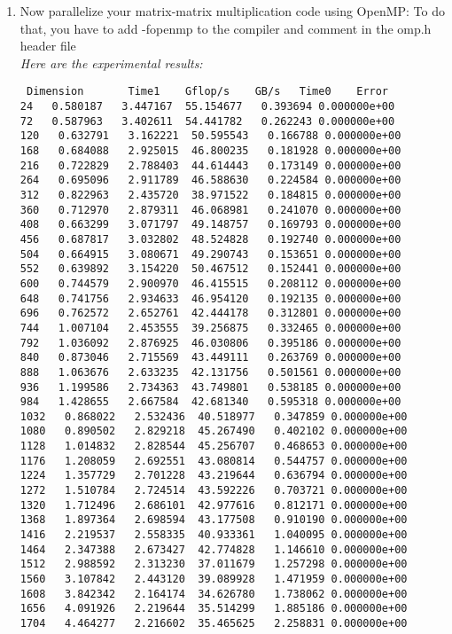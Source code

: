 \documentclass{article}
\begin{document}
\begin{enumerate}
\begin{enumerate}
\item  Now parallelize your matrix-matrix multiplication code using OpenMP: To do that, you have to add -fopenmp to the compiler and comment in the omp.h header file
\\\textit{Here are the experimental results:}
\begin{verbatim}
 Dimension       Time1    Gflop/s    GB/s   Time0    Error
24   0.580187   3.447167  55.154677   0.393694 0.000000e+00
72   0.587963   3.402611  54.441782   0.262243 0.000000e+00
120   0.632791   3.162221  50.595543   0.166788 0.000000e+00
168   0.684088   2.925015  46.800235   0.181928 0.000000e+00
216   0.722829   2.788403  44.614443   0.173149 0.000000e+00
264   0.695096   2.911789  46.588630   0.224584 0.000000e+00
312   0.822963   2.435720  38.971522   0.184815 0.000000e+00
360   0.712970   2.879311  46.068981   0.241070 0.000000e+00
408   0.663299   3.071797  49.148757   0.169793 0.000000e+00
456   0.687817   3.032802  48.524828   0.192740 0.000000e+00
504   0.664915   3.080671  49.290743   0.153651 0.000000e+00
552   0.639892   3.154220  50.467512   0.152441 0.000000e+00
600   0.744579   2.900970  46.415515   0.208112 0.000000e+00
648   0.741756   2.934633  46.954120   0.192135 0.000000e+00
696   0.762572   2.652761  42.444178   0.312801 0.000000e+00
744   1.007104   2.453555  39.256875   0.332465 0.000000e+00
792   1.036092   2.876925  46.030806   0.395186 0.000000e+00
840   0.873046   2.715569  43.449111   0.263769 0.000000e+00
888   1.063676   2.633235  42.131756   0.501561 0.000000e+00
936   1.199586   2.734363  43.749801   0.538185 0.000000e+00
984   1.428655   2.667584  42.681340   0.595318 0.000000e+00
1032   0.868022   2.532436  40.518977   0.347859 0.000000e+00
1080   0.890502   2.829218  45.267490   0.402102 0.000000e+00
1128   1.014832   2.828544  45.256707   0.468653 0.000000e+00
1176   1.208059   2.692551  43.080814   0.544757 0.000000e+00
1224   1.357729   2.701228  43.219644   0.636794 0.000000e+00
1272   1.510784   2.724514  43.592226   0.703721 0.000000e+00
1320   1.712496   2.686101  42.977616   0.812171 0.000000e+00
1368   1.897364   2.698594  43.177508   0.910190 0.000000e+00
1416   2.219537   2.558335  40.933361   1.040095 0.000000e+00
1464   2.347388   2.673427  42.774828   1.146610 0.000000e+00
1512   2.988592   2.313230  37.011679   1.257298 0.000000e+00
1560   3.107842   2.443120  39.089928   1.471959 0.000000e+00
1608   3.842342   2.164174  34.626780   1.738062 0.000000e+00
1656   4.091926   2.219644  35.514299   1.885186 0.000000e+00
1704   4.464277   2.216602  35.465625   2.258831 0.000000e+00

\end{verbatim}
\end{enumerate}
\end{enumerate}
\end{document}
